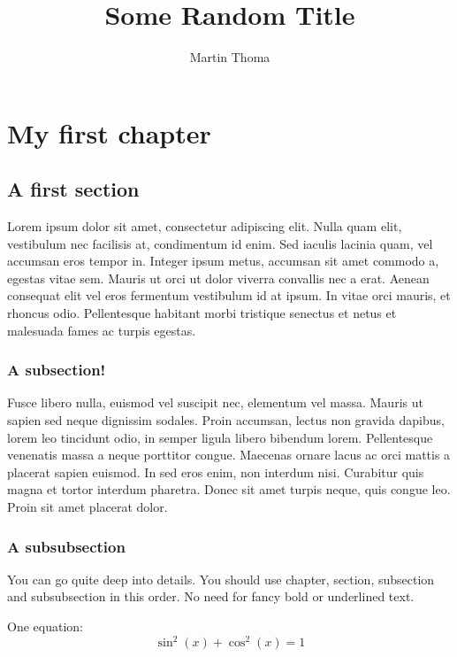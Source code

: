 \documentclass[11pt,a4paper,oneside]{report}
\newcommand\yourName{Martin Thoma}
\newcommand\yourTitle{Some Random Title}
\begin{document}
 \author{\yourName}
 \title{\yourTitle}

 \maketitle
 \tableofcontents

\chapter{My first chapter}
\section{A first section}
Lorem ipsum dolor sit amet, consectetur adipiscing elit. Nulla quam 
elit, vestibulum nec facilisis at, condimentum id enim. Sed iaculis 
lacinia quam, vel accumsan eros tempor in. Integer ipsum metus, 
accumsan sit amet commodo a, egestas vitae sem. Mauris ut orci ut 
dolor viverra convallis nec a erat. Aenean consequat elit vel eros 
fermentum vestibulum id at ipsum. In vitae orci mauris, et rhoncus 
odio. Pellentesque habitant morbi tristique senectus et netus et 
malesuada fames ac turpis egestas.

\subsection{A subsection!}
Fusce libero nulla, euismod vel suscipit nec, elementum vel massa. 
Mauris ut sapien sed neque dignissim sodales. Proin accumsan, lectus 
non gravida dapibus, lorem leo tincidunt odio, in semper ligula 
libero bibendum lorem. Pellentesque venenatis massa a neque porttitor
congue. Maecenas ornare lacus ac orci mattis a placerat sapien 
euismod. In sed eros enim, non interdum nisi. Curabitur quis magna 
et tortor interdum pharetra. Donec sit amet turpis neque, quis congue
leo. Proin sit amet placerat dolor.

\subsection{A subsubsection}
You can go quite deep into details. You should use chapter, section, 
subsection and subsubsection in this order. No need for fancy bold or
underlined text.

One equation:
\begin{equation}
    \sin^2(x) + \cos^2(x) = 1
\end{equation}
\end{document}
